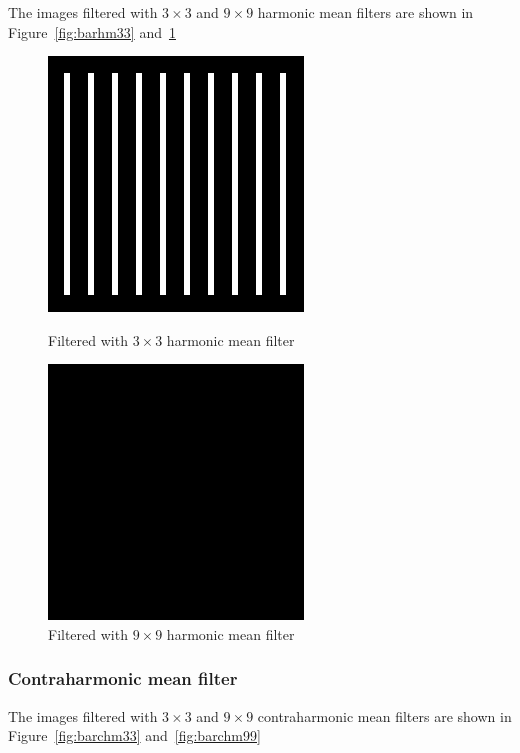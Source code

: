 \documentclass{article}
\begin{document}
The images filtered with $3 \times 3$ and $9 \times 9$ harmonic mean filters are shown in Figure~\ref{fig:barhm33} and~\ref{fig:barhm99}
\begin{figure}[H]
	\captionsetup{justification=centering,margin=1cm}
	\begin{minipage}[b]{0.48\linewidth}
		\centering
		\includegraphics[width=192pt]{../result/task1/harmonic-mean-3-3.png}
		\caption{Filtered with $3 \times 3$ harmonic mean filter}
		\label{fig:barhm33}
	\end{minipage}
	\begin{minipage}[b]{0.48\linewidth}
		\centering
		\includegraphics[width=192pt]{../result/task1/harmonic-mean-9-9.png}
		\caption{Filtered with $9 \times 9$ harmonic mean filter}
		\label{fig:barhm99}
	\end{minipage}
\end{figure}

\subsubsection{Contraharmonic mean filter}

The images filtered with $3 \times 3$ and $9 \times 9$ contraharmonic mean filters are shown in Figure~\ref{fig:barchm33} and~\ref{fig:barchm99}
\end{document}
